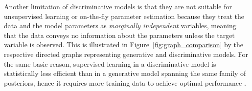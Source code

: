 \documentclass[english]{scrartcl}
\begin{document}




Another limitation of discriminative models is that they are not suitable for unsupervised learning or on-the-fly parameter estimation because they treat the data and the model parameters as {\em marginally independent} variables, meaning that the data conveys no information about the parameters unless the target variable is observed. This is illustrated in Figure~\ref{fig:graph_comparison} by the respective directed graphs representing generative and discriminative models. For the same basic reason, supervised learning in a discriminative model is statistically less efficient than in a generative model spanning the same family of posteriors, hence it requires more training data to achieve optimal performance \cite{Ng-01}. 
\end{document}
